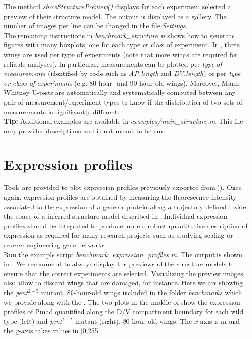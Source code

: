 The method \textit{showStructurePreview()} displays for each experiment selected a preview of their structure model. The output is displayed as a gallery. The number of images per line can be changed in the file \emph{Settings}.\\

The remaining instructions in \textit{benchmark\_structure.m} shows how to generate figures with many boxplots, one for each type or class of experiment. In , three wings are used per type of experiments (note that more wings are required for reliable analyses). In particular, measurements can be plotted per \emph{type of measurements} (identified by \wingj code such as \textit{AP.length} and \textit{DV.length}) or per \emph{type or class of experiments} (e.g. 80-hour- and 90-hour-old wings). Moreover, Mann-Whitney U-tests \autocite{hollander1999nonparametric} are automatically and systematically computed between any pair of measurement/experiment types to know if the distribution of two sets of measurements is significantly different.\\

\textbf{Tip:} Additional examples are available in \emph{examples/main\_structure.m}. This file only provides descriptions and is not meant to be run.

\section{Expression profiles}\label{sec:matlab_profiles}
Tools are provided to plot expression profiles previously exported from \wingj (). Once again, expression profiles are obtained by measuring the fluorescence intensity associated to the expression of a gene or protein along a trajectory defined inside the space of a inferred structure model described in . Individual expression profiles should be integrated to produce more a robust quantitative description of expression as required for many research projects such as studying scaling \autocite{de2010precision,hamaratoglu2011dpp} or reverse engineering gene networks \autocite{jaeger2004dynamic,perkins2006reverse}.\\

Run the example script \textit{benchmark\_expression\_profiles.m}. The output is shown in . We recommend to always display the previews of the structure models to ensure that the correct experiments are selected. Visualizing the preview images also allow to discard wings that are damaged, for instance. Here we are showing the \textit{pent$^{2-5}$} mutant, 80-hour-old wings included in the folder \emph{benchmarks} which we provide along with the \wingjMatlab. The two plots in the middle of  show the expression profiles of Pmad quantified along the D/V compartment boundary for each wild type (left) and \textit{pent$^{2-5}$} mutant (right), 80-hour-old wings. The $x$-axis is in \mum and the $y$-axis takes values in [0,255].\\

